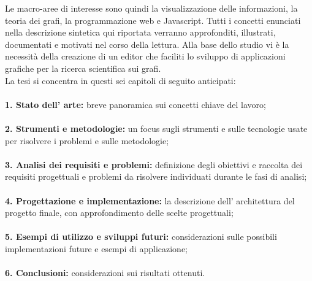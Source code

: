 Le macro-aree di interesse sono quindi la visualizzazione delle informazioni, la teoria dei grafi, la programmazione web e Javascript. Tutti i concetti enunciati nella descrizione sintetica qui riportata verranno approfonditi, illustrati, documentati e motivati nel corso della lettura. Alla base dello studio vi è la necessità della creazione di un editor che faciliti lo sviluppo di applicazioni grafiche per la ricerca scientifica sui grafi.\\
La tesi si concentra in questi sei capitoli di seguito anticipati:\\ \\
\textbf{1. Stato dell' arte:} breve panoramica sui concetti chiave del lavoro;\\ \\
\textbf{2. Strumenti e metodologie: }un focus sugli strumenti e sulle tecnologie usate per risolvere i problemi e sulle metodologie;\\ \\
\textbf{3. Analisi dei requisiti e problemi:} definizione degli obiettivi e raccolta dei requisiti progettuali e problemi da risolvere individuati durante le fasi di analisi;\\ \\
\textbf{4. Progettazione e implementazione: }la descrizione dell' architettura del progetto finale, con approfondimento delle scelte progettuali;\\ \\
\textbf{5. Esempi di utilizzo e sviluppi futuri:} considerazioni sulle possibili implementazioni future e esempi di applicazione;\\ \\
\textbf{6. Conclusioni: }considerazioni sui risultati ottenuti.
\vspace{0.5cm}
